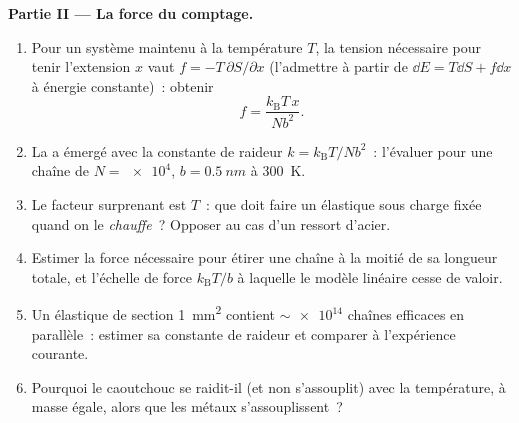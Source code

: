 \begin{problem}
\medskip\noindent\textbf{Partie II --- La force du comptage.}
\begin{enumerate}[resume]
  \item Pour un système maintenu à la température $T$, la tension
        nécessaire pour tenir l'extension $x$ vaut
        $f = -T\,\partial S/\partial x$ (l'admettre à partir de
        $\dd E = T\dd S + f\dd x$ à énergie constante)~: obtenir
        \[
        f = \frac{k_{\text{B}}T\,x}{Nb^2} .
        \]
  \item La  a émergé avec la constante de raideur $k =
        k_{\text{B}}T/Nb^2$~: l'évaluer pour une chaîne de $N =
        \num{e4}$, $b = \qty{0.5}{nm}$ à \qty{300}{K}.
  \item Le facteur surprenant est $T$~: que doit faire un élastique
        sous charge fixée quand on le \emph{chauffe}~? Opposer au cas
        d'un ressort d'acier.
  \item Estimer la force nécessaire pour étirer une chaîne à la moitié
        de sa longueur totale, et l'échelle de force
        $k_{\text{B}}T/b$ à laquelle le modèle linéaire cesse de
        valoir.
  \item Un élastique de section \qty{1}{mm^2} contient
        $\sim\num{e14}$ chaînes efficaces en parallèle~: estimer sa
        constante de raideur et comparer à l'expérience courante.
  \item Pourquoi le caoutchouc se raidit-il (et non s'assouplit) avec
        la température, à masse égale, alors que les métaux
        s'assouplissent~?
\end{enumerate}


\end{problem}
